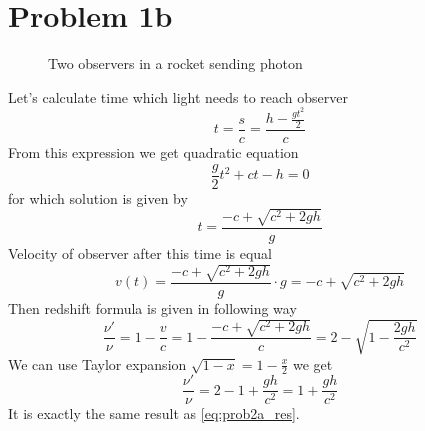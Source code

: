 \section*{Problem 1b}

\begin{wrapfigure}[16]{R}{0.5\linewidth}
    \centering
    \caption{Two observers in a rocket sending photon}
\end{wrapfigure}

Let's calculate time which light needs to reach observer 
%
\begin{equation}
    t = \frac{s}{c} = \frac{h - \frac{gt^2}{2}}{c}
\end{equation}
%
From this expression we get quadratic equation 
%
\begin{equation}
    \frac{g}{2}t^2 + ct - h = 0
\end{equation}
%
for which solution is given by
%
\begin{equation}
    t = \frac{-c + \sqrt{c^2+2gh}}{g}
\end{equation}
%
Velocity of observer  after this time is equal 
%
\begin{equation}
    v(t) = \frac{-c + \sqrt{c^2+2gh}}{g} \cdot g = -c + \sqrt{c^2+2gh}
\end{equation}
%
Then redshift formula is given in following way
%
\begin{equation}
    \frac{\nu'}{\nu} = 1 - \frac{v}{c} = 1 - \frac{-c + \sqrt{c^2+2gh}}{c} = 
    2 - \sqrt{1-\frac{2gh}{c^2}} 
\end{equation}
%
We can use Taylor expansion $\sqrt{1-x} = 1-\frac{x}{2}$ we get
%
\begin{equation}
    \boxed{\frac{\nu'}{\nu} = 2 - 1 + \frac{gh}{c^2} = 1 + \frac{gh}{c^2} }
\end{equation}
%
It is exactly the same result as \autoref{eq:prob2a_res}.